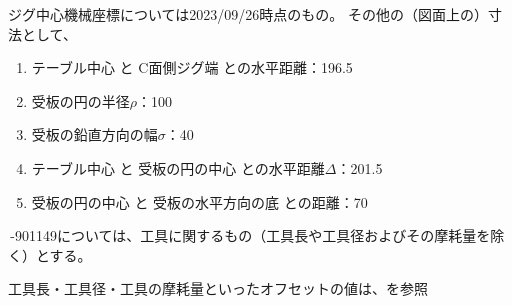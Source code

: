 \begin{hosoku}
ジグ中心機械座標については2023/09/26時点のもの。
その他の（図面上の）寸法として、
\begin{enumerate}
\item テーブル中心 と C面側ジグ端 との水平距離：196.5
\item 受板の円の半径$\rho$：100
\item 受板の鉛直方向の幅$\sigma$：40
\item テーブル中心 と 受板の円の中心 との水平距離$\varDelta$：201.5
\item 受板の円の中心 と 受板の水平方向の底 との距離：70
\end{enumerate}
\end{hosoku}



\clearpage
\,-\ttNum901149については、工具に関するもの（工具長や工具径およびその摩耗量を除く）とする。
\begin{hosoku}
工具長・工具径・工具の摩耗量といったオフセットの値は、を参照
\end{hosoku}

